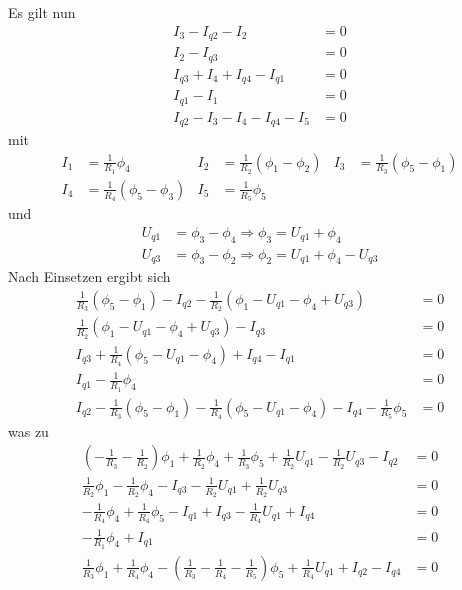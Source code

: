 \documentclass{article}
\begin{document}
Es gilt nun
\begin{align*}
    I_3 - I_{q2} - I_2 &= 0 \\
    I_2 - I_{q3} &= 0 \\
    I_{q3} + I_4 + I_{q4} - I_{q1} &= 0 \\
    I_{q1} - I_1 &= 0 \\
    I_{q2} - I_3 - I_4 - I_{q4} - I_5 &= 0
\end{align*}
mit
\begin{align*}
    I_1 &= \frac{1}{R_1}\phi_4 &
    I_2 &= \frac{1}{R_2}(\phi_1 - \phi_2) &
    I_3 &= \frac{1}{R_3}(\phi_5 - \phi_1) \\
    I_4 &= \frac{1}{R_4}(\phi_5 - \phi_3) &
    I_5 &= \frac{1}{R_5}\phi_5 &
\end{align*}
und
\begin{align*}
    U_{q1} &= \phi_3 - \phi_4 \Rightarrow \phi_3 = U_{q1} + \phi_4 \\
    U_{q3} &= \phi_3 - \phi_2 \Rightarrow \phi_2 = U_{q1} + \phi_4 - U_{q3}
\end{align*}
Nach Einsetzen ergibt sich
\begin{align*}
    \frac{1}{R_3}(\phi_5 - \phi_1) - I_{q2} - \frac{1}{R_2}(\phi_1 - U_{q1} - \phi_4 + U_{q3}) &= 0 \\
    \frac{1}{R_2}(\phi_1 - U_{q1} - \phi_4 + U_{q3}) - I_{q3} &= 0 \\
    I_{q3} + \frac{1}{R_4}(\phi_5 - U_{q1} - \phi_4) + I_{q4} - I_{q1} &= 0 \\
    I_{q1} - \frac{1}{R_1}\phi_4 &= 0 \\
    I_{q2} - \frac{1}{R_3}(\phi_5 - \phi_1) - \frac{1}{R_4}(\phi_5 - U_{q1} - \phi_4) - I_{q4} - \frac{1}{R_5}\phi_5 &= 0
\end{align*}
was zu
\begin{align*}
    \left(-\frac{1}{R_3} - \frac{1}{R_2}\right)\phi_1 + \frac{1}{R_2}\phi_4 + \frac{1}{R_3}\phi_5 + \frac{1}{R_2}U_{q1} - \frac{1}{R_2}U_{q3} - I_{q2}  &= 0 \\
    \frac{1}{R_2}\phi_1 - \frac{1}{R_2}\phi_4 - I_{q3} - \frac{1}{R_2}U_{q1} + \frac{1}{R_2}U_{q3} &= 0 \\
    - \frac{1}{R_4}\phi_4 + \frac{1}{R_4}\phi_5 - I_{q1} + I_{q3} - \frac{1}{R_4}U_{q1} + I_{q4} &= 0 \\
    - \frac{1}{R_1}\phi_4 + I_{q1} &= 0 \\
    \frac{1}{R_3}\phi_1 + \frac{1}{R_4}\phi_4 - \left(\frac{1}{R_3} - \frac{1}{R_4} - \frac{1}{R_5}\right)\phi_5 + \frac{1}{R_4}U_{q1} + I_{q2} - I_{q4} &= 0
\end{align*}
\end{document}

